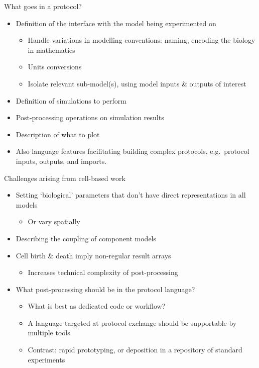 \documentclass[t,xcolor={usenames,dvipsnames}]{beamer}
\newcommand{\subitem}[1]{\begin{itemize}[<.->]\item #1 \end{itemize}}
\begin{document}
\begin{frame}{What goes in a protocol?}
\begin{itemize}
\item Definition of the interface with the model being experimented on
  \begin{itemize}
  \item Handle variations in modelling conventions: naming, encoding the biology in mathematics
  \item Units conversions
  \item Isolate relevant sub-model(s), using model inputs \& outputs of interest
  \end{itemize}
\item Definition of simulations to perform
\item Post-processing operations on simulation results
\item Description of what to plot
\vspace{.5cm}
\item Also language features facilitating building complex protocols, e.g.\ protocol inputs, outputs, and imports.
\end{itemize}
\end{frame}


\begin{frame}{Challenges arising from cell-based work}
\begin{itemize}
\item Setting `biological' parameters that don't have direct representations in all models
  \subitem{Or vary spatially}
\item Describing the coupling of component models
\item Cell birth \& death imply non-regular result arrays
  \subitem{Increases technical complexity of post-processing}
\item What post-processing should be in the protocol language?
  \begin{itemize}[<.->]
  \item What is best as dedicated code or workflow?
  \item A language targeted at protocol exchange should be supportable by multiple tools
  \item Contrast: rapid prototyping, or deposition in a repository of standard experiments
  \end{itemize}
\end{itemize}
\end{frame}
\end{document}
